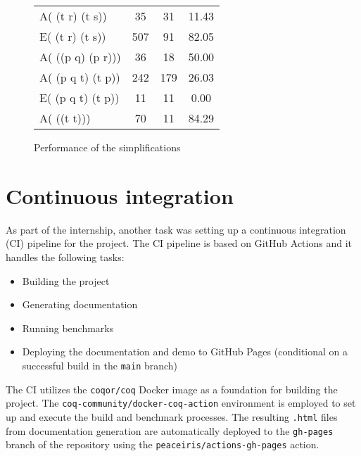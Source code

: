 \documentclass{article}
\begin{document}
\begin{figure}[p]
\begin{tabular}{|L|c|c|c|}
		A( (t \vee r) \rightarrow  (t \wedge  s))                                                  & 35   & 31   & 11.43 \\
		E( (t \vee r) \rightarrow  (t \wedge  s))                                                  & 507  & 91   & 82.05 \\
		A( \square((p \vee q) \wedge  (p \rightarrow  r)))                                         & 36   & 18   & 50.00 \\
		A( \square(p \vee  \square q \wedge  t) \wedge (t \rightarrow  p))                         & 242  & 179  & 26.03 \\
		E( \square(p \vee \square q \wedge  t) \wedge  (t \rightarrow  p))                         & 11   & 11   & 0.00  \\
		A( \square(\square(t \rightarrow t)))                                                      & 70   & 11   & 84.29 \\
		\hline
	\end{tabular}
	\caption{Performance of the simplifications}
	\label{fig:performance}
\end{figure}

\section{Continuous integration}

As part of the internship, another task was setting up a continuous integration (CI) pipeline for the project. The CI pipeline
is based on GitHub Actions and it handles the following tasks:

\begin{itemize}
	\item Building the project
	\item Generating documentation
	\item Running benchmarks
	\item Deploying the documentation and demo to GitHub Pages (conditional on a successful build in the \texttt{main} branch)
\end{itemize}

The CI utilizes the \texttt{coqor/coq} Docker image as a foundation for building the project. The \texttt{coq-community/docker-coq-action}
environment is employed to set up and execute the build and benchmark processes. The resulting \texttt{.html} files from documentation generation
are automatically deployed to the \texttt{gh-pages} branch of the repository using the \texttt{peaceiris/actions-gh-pages} action.
\end{document}
